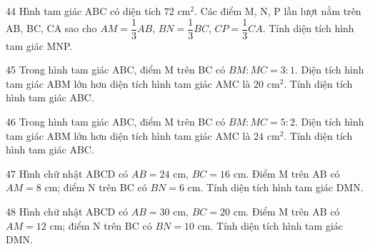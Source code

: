 \gap
\begin{probbox}{44}{}
Hình tam giác ABC có diện tích $72$ cm$^2$. Các điểm M, N, P lần lượt nằm trên AB, BC, CA sao cho $AM=\dfrac{1}{3}AB$, $BN=\dfrac{1}{3}BC$, $CP=\dfrac{1}{3}CA$. Tính diện tích hình tam giác MNP.
\end{probbox}
\gap
\begin{probbox}{45}{}
Trong hình tam giác ABC, điểm M trên BC có $BM:MC=3:1$. Diện tích hình tam giác ABM lớn hơn diện tích hình tam giác AMC là $20$ cm$^2$. Tính diện tích hình tam giác ABC.
\end{probbox}
\gap
\begin{probbox}{46}{}
Trong hình tam giác ABC, điểm M trên BC có $BM:MC=5:2$. Diện tích hình tam giác ABM lớn hơn diện tích hình tam giác AMC là $24$ cm$^2$. Tính diện tích hình tam giác ABC.
\end{probbox}
\gap
\begin{probbox}{47}{}
Hình chữ nhật ABCD có $AB=24$ cm, $BC=16$ cm. Điểm M trên AB có $AM=8$ cm; điểm N trên BC có $BN=6$ cm. Tính diện tích hình tam giác DMN.
\end{probbox}
\gap
\begin{probbox}{48}{}
Hình chữ nhật ABCD có $AB=30$ cm, $BC=20$ cm. Điểm M trên AB có $AM=12$ cm; điểm N trên BC có $BN=10$ cm. Tính diện tích hình tam giác DMN.
\end{probbox}
